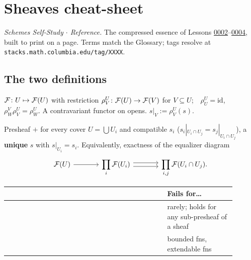 \chapter{Sheaves cheat-sheet}\label{ch:refB-sheaves}

\noindent\emph{Schemes Self-Study $\cdot$ Reference.} The compressed essence of
Lessons \href{../lessons/0002-presheaves-and-the-sheaf-condition.html}{0002}--\href{../lessons/0004-sheaves-on-a-basis.html}{0004},
built to print on a page. Terms match the Glossary; tags resolve at
\texttt{stacks.math.\allowbreak columbia.edu/\allowbreak tag/XXXX}.

\section{The two definitions}

\begin{defbox}
$\mathcal{F}\colon U\mapsto\mathcal{F}(U)$ with restriction $\rho^U_V\colon\mathcal{F}(U)\to\mathcal{F}(V)$
for $V\subseteq U$;\ \ $\rho^U_U=\mathrm{id}$,\ \ $\rho^V_W\rho^U_V=\rho^U_W$. A
contravariant functor on opens. $s|_V:=\rho^U_V(s)$.
\end{defbox}

\begin{defbox}
Presheaf $+$ for every cover $U=\bigcup U_i$ and compatible $s_i$
($s_i|_{U_i\cap U_j}=s_j|_{U_i\cap U_j}$), a \textbf{unique} $s$ with
$s|_{U_i}=s_i$. Equivalently, exactness of the equalizer diagram
\[
\begin{tikzcd}[ampersand replacement=\&, column sep=large]
\sF(U) \arrow[r]
\& \displaystyle\prod_i\sF(U_i)
  \arrow[r, shift left=0.6ex]
  \arrow[r, shift right=0.6ex]
\& \displaystyle\prod_{i,j}\sF(U_i\cap U_j).
\end{tikzcd}
\]
\end{defbox}

\begin{center}
\begin{tabular}{@{}L{0.18\linewidth} L{0.45\linewidth} L{0.27\linewidth}@{}}
\toprule
{} &  & \textbf{Fails for\ldots} \\
\midrule
{} &  & rarely; holds for any sub-presheaf of a sheaf \\
\addlinespace
{}  &  & bounded fns, extendable fns \\
\bottomrule
\end{tabular}
\end{center}

